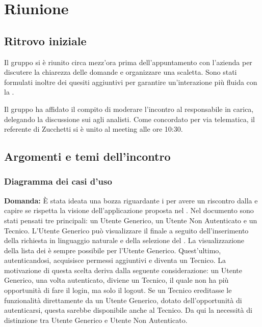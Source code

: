\section{Riunione}
\subsection{Ritrovo iniziale}
Il gruppo si è riunito circa mezz’ora prima dell’appuntamento con l’azienda per discutere la chiarezza delle domande e organizzare una scaletta. Sono stati formulati inoltre dei quesiti aggiuntivi per garantire un’interazione più fluida con la .

Il gruppo ha affidato il compito di moderare l’incontro al responsabile in carica, delegando la discussione sui  agli analisti. Come concordato per via telematica, il referente di Zucchetti si è unito al meeting alle ore 10:30.

\subsection{Argomenti e temi dell'incontro}


\subsubsection{Diagramma dei casi d'uso}

\textbf{Domanda:} È stata ideata una bozza riguardante i  per avere un riscontro dalla  e capire se rispetta la visione dell’applicazione proposta nel .
Nel documento sono stati pensati tre  principali: un Utente Generico, un Utente Non Autenticato e un Tecnico.
L'Utente Generico può visualizzare il  finale a seguito dell'inserimento della richiesta in linguaggio naturale e della selezione del . La visualizzazione della lista dei  è sempre possibile per l'Utente Generico. Quest'ultimo, autenticandosi, acquisisce permessi aggiuntivi e diventa un Tecnico.
La motivazione di questa scelta deriva dalla seguente considerazione: un Utente Generico, una volta autenticato, diviene un Tecnico, il quale non ha più opportunità di fare il login, ma solo il logout. Se un Tecnico ereditasse le funzionalità direttamente da un Utente Generico, dotato dell'opportunità di autenticarsi, questa sarebbe disponibile anche al Tecnico. Da qui la necessità di distinzione tra Utente Generico e Utente Non Autenticato.

